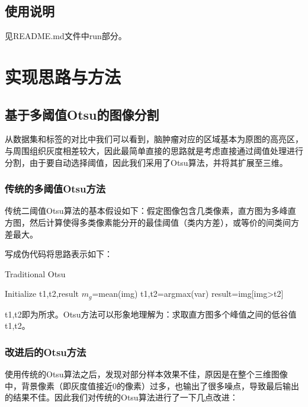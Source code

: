 \documentclass[UTF8]{ctexart}
\begin{document}
\subsection{使用说明}
见README.md文件中run部分。

\section{实现思路与方法}
\subsection{基于多阈值Otsu的图像分割}
从数据集和标签的对比中我们可以看到，脑肿瘤对应的区域基本为原图的高亮区，与周围组织灰度相差较大，因此最简单直接的思路就是考虑直接通过阈值处理进行分割，由于要自动选择阈值，因此我们采用了Otsu算法，并将其扩展至三维。

\subsubsection{传统的多阈值Otsu方法}
传统二阈值Otsu算法的基本假设如下：假定图像包含几类像素，直方图为多峰直方图，然后计算使得多类像素能分开的最佳阈值（类内方差），或等价的间类间方差最大。

写成伪代码将思路表示如下：

\begin{algorithm}[H]
    \caption{Traditional Otsu}\label{algorithm}
        Initialize t1,t2,result\;
        $m_g$=mean(img)\;
        t1,t2=argmax(var)\;
        result=img[img>t2]\;
        
\end{algorithm}

	t1,t2即为所求。Otsu方法可以形象地理解为：求取直方图多个峰值之间的低谷值t1,t2。
\subsubsection{改进后的Otsu方法}
使用传统的Otsu算法之后，发现对部分样本效果不佳，原因是在整个三维图像中，背景像素（即灰度值接近0的像素）过多，也输出了很多噪点，导致最后输出的结果不佳。因此我们对传统的Otsu算法进行了一下几点改进：
\end{document}
